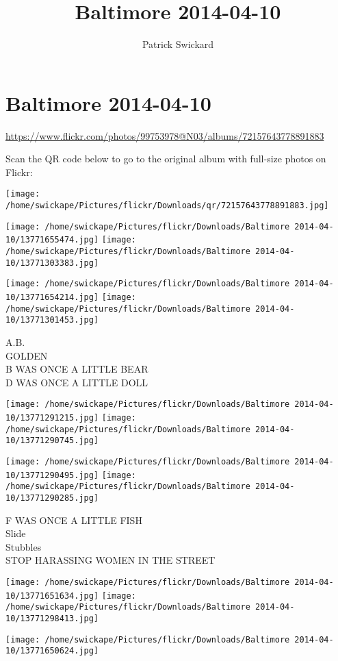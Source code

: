 \documentclass[10pt,letterpaper]{article}
\title{Baltimore 2014-04-10}
\author{Patrick Swickard}
\date{}
\begin{document}
\section*{Baltimore 2014-04-10}

\url{https://www.flickr.com/photos/99753978@N03/albums/72157643778891883}

Scan the QR code below to go to the original album with full-size photos on Flickr:

\texttt{[image: /home/swickape/Pictures/flickr/Downloads/qr/72157643778891883.jpg]}
\pagebreak

\texttt{[image: /home/swickape/Pictures/flickr/Downloads/Baltimore 2014-04-10/13771655474.jpg]}
\texttt{[image: /home/swickape/Pictures/flickr/Downloads/Baltimore 2014-04-10/13771303383.jpg]}

\texttt{[image: /home/swickape/Pictures/flickr/Downloads/Baltimore 2014-04-10/13771654214.jpg]}
\texttt{[image: /home/swickape/Pictures/flickr/Downloads/Baltimore 2014-04-10/13771301453.jpg]}

A.B.\\
GOLDEN\\
B WAS ONCE A LITTLE BEAR\\
D WAS ONCE A LITTLE DOLL
\pagebreak

\texttt{[image: /home/swickape/Pictures/flickr/Downloads/Baltimore 2014-04-10/13771291215.jpg]}
\texttt{[image: /home/swickape/Pictures/flickr/Downloads/Baltimore 2014-04-10/13771290745.jpg]}

\texttt{[image: /home/swickape/Pictures/flickr/Downloads/Baltimore 2014-04-10/13771290495.jpg]}
\texttt{[image: /home/swickape/Pictures/flickr/Downloads/Baltimore 2014-04-10/13771290285.jpg]}

F WAS ONCE A LITTLE FISH\\
Slide\\
Stubbles\\
STOP HARASSING WOMEN IN THE STREET
\pagebreak

\texttt{[image: /home/swickape/Pictures/flickr/Downloads/Baltimore 2014-04-10/13771651634.jpg]}
\texttt{[image: /home/swickape/Pictures/flickr/Downloads/Baltimore 2014-04-10/13771298413.jpg]}

\vspace{0.25in}
\texttt{[image: /home/swickape/Pictures/flickr/Downloads/Baltimore 2014-04-10/13771650624.jpg]}
\end{document}
